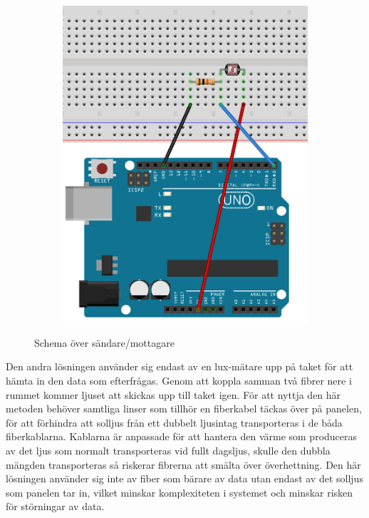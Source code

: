 \begin{figure}
\begin{subfigure}[b]{0.35\textwidth}
                    \includegraphics[width=\textwidth]{res/img/resistor}    
                \end{subfigure}
            \caption{Schema över sändare/mottagare}\label{fig:schema}
            \end{figure}

            Den andra lösningen använder sig endast av en lux-mätare upp på taket för att hämta in den data som efterfrågas. Genom att koppla samman två fibrer nere i rummet kommer ljuset att skickas upp till taket igen. För att nyttja den här metoden behöver samtliga linser som tillhör en fiberkabel täckas över på panelen, för att förhindra att solljus från ett dubbelt ljusintag transporteras i de båda fiberkablarna. Kablarna är anpassade för att hantera den värme som produceras av det ljus som normalt transporteras vid fullt dagsljus, skulle den dubbla mängden transporteras så riskerar fibrerna att smälta över överhettning. Den här lösningen använder sig inte av fiber som bärare av data utan endast av det solljus som panelen tar in, vilket minskar komplexiteten i systemet och minskar risken för störningar av data. 

